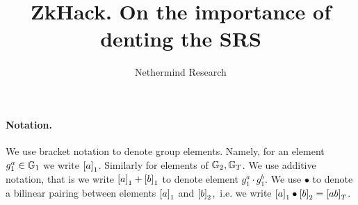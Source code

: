 \documentclass[runningheads,11pt,a4paper]{llncs}
\title{ZkHack. On the importance of denting the SRS}
\author{Nethermind Research}
\institute{}
\begin{document}
\sloppy
\maketitle

\paragraph{Notation.}
We use bracket notation to denote group elements. Namely, for an element $g_1^{a} \in \mathbb{G}_1$ we write $\left[a\right]_{1}$. Similarly for elements of $\mathbb{G}_2, \mathbb{G}_T$. We use additive notation, that is we write $\left[a\right]_{1} + \left[b\right]_{1}$ to denote element $g_1^{a} \cdot g_1^{b}$. We use $\bullet$ to denote a bilinear pairing between elements $\left[a\right]_{1}$ and $\left[b\right]_{2}$,~i.e. we write $\left[a\right]_{1} \bullet \left[b\right]_{2} = \left[ab\right]_{T}$.



\newcommand{\ck}{\pcalgostyle{ck}}
\end{document}
